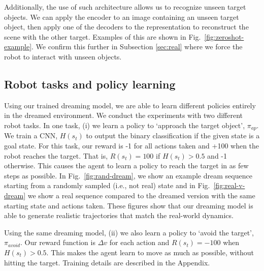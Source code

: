 \documentclass[letterpaper, 10 pt, conference]{ieeeconf}
\begin{document}
Additionally, the use of such architecture allows us to recognize unseen target objects. We can apply the encoder to an image containing an unseen target object, then apply one of the decoders to the representation to reconstruct the scene with the other target. Examples of this are shown in Fig.~\ref{fig:zeroshot-example}. We confirm this further in Subsection \ref{sec:real} where we force the robot to interact with unseen objects.




\subsection{Robot tasks and policy learning}
Using our trained dreaming model, we are able to learn different policies entirely in the dreamed environment. We conduct the experiments with two different robot tasks. In one task, (i) we learn a policy to `approach the target object', $\pi_{ap}$. We train a CNN, $H(s_t)$ to output the binary classification if the given state is a goal state. 
For this task, our reward is -1 for all actions taken and +100 when the robot reaches the target. That is, $R(s_t) = 100$ if $H(s_t) > 0.5$ and -1 otherwise.
 This causes the agent to learn a policy to reach the target in as few steps as possible.
 In Fig.~\ref{fig:rand-dream}, we show an example dream sequence starting from a randomly sampled (i.e., not real) state and in Fig.~\ref{fig:real-v-dream} we show a real sequence compared to the dreamed version with the same starting state and actions taken. These figures show that our dreaming model is able to generate realistic trajectories that match the real-world dynamics.




Using the same dreaming model, (ii) we also learn a policy to `avoid the target', $\pi_{avoid}$. Our reward function is $\Delta v$ for each action and $R(s_t) = -100$ when $H(s_t) > 0.5$. This makes the agent learn to move as much as possible, without hitting the target. Training details are described in the Appendix.
\end{document}
